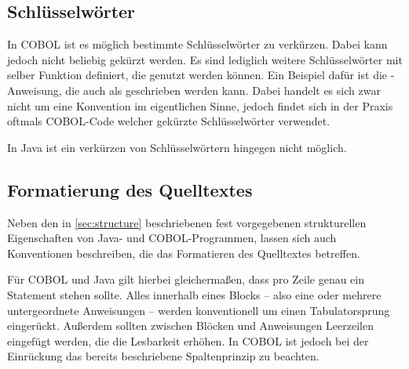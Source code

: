 \subsection{Schlüsselwörter}
In COBOL ist es möglich bestimmte Schlüsselwörter zu verkürzen. Dabei kann jedoch nicht beliebig gekürzt werden. Es sind lediglich weitere Schlüsselwörter mit selber Funktion definiert, die genutzt werden können. Ein Beispiel dafür ist die -Anweisung, die auch als  geschrieben werden kann. Dabei handelt es sich zwar nicht um eine Konvention im eigentlichen Sinne, jedoch findet sich in der Praxis oftmals COBOL-Code welcher gekürzte Schlüsselwörter verwendet.

In Java ist ein verkürzen von Schlüsselwörtern hingegen nicht möglich.

\subsection{Formatierung des Quelltextes}

Neben den in \autoref{sec:structure} beschriebenen fest vorgegebenen strukturellen Eigenschaften von Java- und COBOL-Programmen, lassen sich auch Konventionen beschreiben, die das Formatieren des Quelltextes betreffen.

Für COBOL und Java gilt hierbei gleichermaßen, dass pro Zeile genau ein Statement stehen sollte. Alles innerhalb eines Blocks -- also eine oder mehrere untergeordnete Anweisungen -- werden konventionell um einen Tabulatorsprung eingerückt. Außerdem sollten zwischen Blöcken und Anweisungen Leerzeilen eingefügt werden, die die Lesbarkeit erhöhen. In COBOL ist jedoch bei der Einrückung das bereits beschriebene Spaltenprinzip zu beachten.